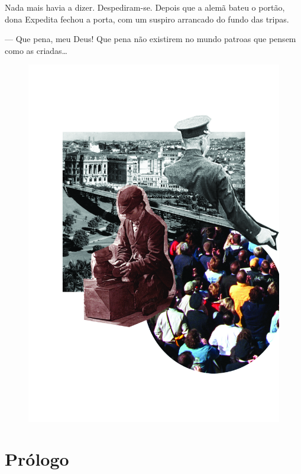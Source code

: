 Nada mais havia a dizer. Despediram-se. Depois que a alemã bateu o
portão, dona Expedita fechou a porta, com um suspiro arrancado do fundo
das tripas.

--- Que pena, meu Deus! Que pena não existirem no mundo patroas que
pensem como as criadas\ldots{}

\blankpage

\pagebreak
\thispagestyle{empty}
\begin{figure}
\vspace*{-.5cm}
\hspace*{-2.3cm}\includegraphics[width=140mm]{../ilustracoes/06_FISCO.jpg}
\end{figure}
\pagebreak


\section{Prólogo}

